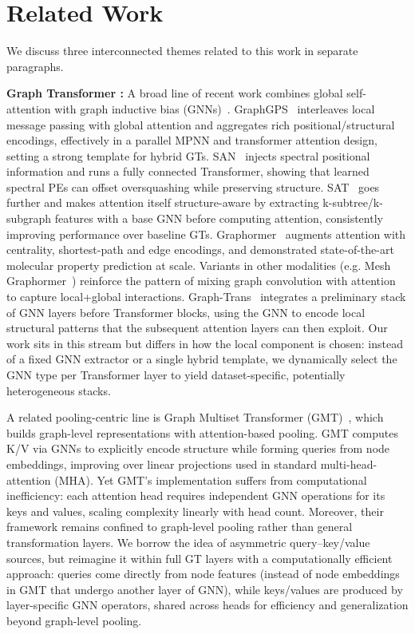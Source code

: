 \documentclass[lettersize,journal]{IEEEtran}
\begin{document}
\section{Related Work}

We discuss three interconnected themes related to this work in separate paragraphs.

\textbf{Graph Transformer :} A broad line of recent work combines global self-attention with graph inductive bias (GNNs)~\cite{wu_representing_2022}. GraphGPS~\cite{rampa_recipe_nodate} interleaves local message passing with global attention and aggregates rich positional/structural encodings, effectively in a parallel MPNN and transformer attention design, setting a strong template for hybrid GTs. SAN~\cite{kreuzer_rethinking_2021} injects spectral positional information and runs a fully connected Transformer, showing that learned spectral PEs can offset oversquashing while preserving structure. SAT~\cite{chen_structure-aware_2022} goes further and makes attention itself structure-aware by extracting k-subtree/k-subgraph features with a base GNN before computing attention, consistently improving performance over baseline GTs. Graphormer~\cite{ying_transformers_2021} augments attention with centrality, shortest-path and edge encodings, and demonstrated state-of-the-art molecular property prediction at scale. Variants in other modalities (e.g. Mesh Graphormer~\cite{lin_mesh_2021}) reinforce the pattern of mixing graph convolution with attention to capture local+global interactions. Graph-Trans~\cite{wu_representing_2022} integrates a preliminary stack of GNN layers before Transformer blocks, using the GNN to encode local structural patterns that the subsequent attention layers can then exploit. 
Our work sits in this stream but differs in how the local component is chosen: instead of a fixed GNN extractor or a single hybrid template, we dynamically select the GNN type per Transformer layer to yield dataset-specific, potentially heterogeneous stacks. 

A related pooling-centric line is Graph Multiset Transformer (GMT)~\cite{baek_accurate_2021}, which builds graph-level representations with attention-based pooling. GMT computes K/V via GNNs to explicitly encode structure while forming queries from node embeddings, improving over linear projections used in standard multi-head-attention (MHA). Yet GMT's implementation suffers from computational inefficiency: each attention head requires independent GNN operations for its keys and values, scaling complexity linearly with head count. Moreover, their framework remains confined to graph-level pooling rather than general transformation layers. We borrow the idea of asymmetric query–key/value sources, but reimagine it within full GT layers with a computationally efficient approach: queries come directly from node features (instead of node embeddings in GMT that undergo another layer of GNN), while keys/values are produced by layer-specific GNN operators, shared across heads for efficiency and generalization beyond graph-level pooling.
\end{document}
